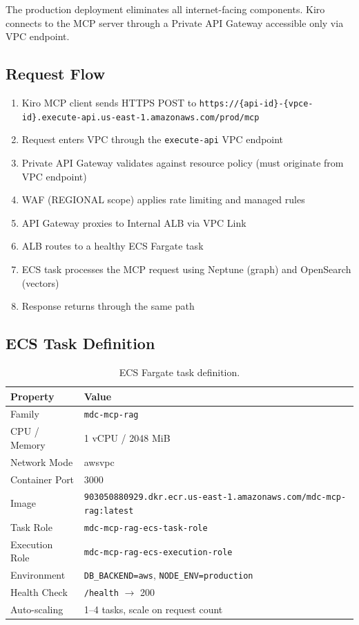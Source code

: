 \documentclass[11pt,letterpaper]{article}
\begin{document}
The production deployment eliminates all internet-facing components. Kiro
connects to the MCP server through a Private API Gateway accessible only
via VPC endpoint.

\subsection{Request Flow}

\begin{enumerate}[noitemsep]
    \item Kiro MCP client sends HTTPS POST to
          \texttt{https://\{api-id\}-\{vpce-id\}.execute-api.\allowbreak us-east-1.amazonaws.com/prod/mcp}
    \item Request enters VPC through the \texttt{execute-api} VPC endpoint
    \item Private API Gateway validates against resource policy (must originate
          from VPC endpoint)
    \item WAF (REGIONAL scope) applies rate limiting and managed rules
    \item API Gateway proxies to Internal ALB via VPC Link
    \item ALB routes to a healthy ECS Fargate task
    \item ECS task processes the MCP request using Neptune (graph) and
          OpenSearch (vectors)
    \item Response returns through the same path
\end{enumerate}

\subsection{ECS Task Definition}

\begin{table}[H]
\centering
\footnotesize
\begin{tabular}{@{}ll@{}}
\toprule
\textbf{Property} & \textbf{Value} \\
\midrule
Family & \texttt{mdc-mcp-rag} \\
CPU / Memory & 1 vCPU / 2048 MiB \\
Network Mode & awsvpc \\
Container Port & 3000 \\
Image & \texttt{903050880929.dkr.ecr.us-east-1.amazonaws.com/mdc-mcp-rag:latest} \\
Task Role & \texttt{mdc-mcp-rag-ecs-task-role} \\
Execution Role & \texttt{mdc-mcp-rag-ecs-execution-role} \\
Environment & \texttt{DB\_BACKEND=aws}, \texttt{NODE\_ENV=production} \\
Health Check & \texttt{/health} $\rightarrow$ 200 \\
Auto-scaling & 1--4 tasks, scale on request count \\
\bottomrule
\end{tabular}
\caption{ECS Fargate task definition.}
\label{tab:ecs-task}
\end{table}
\end{document}
